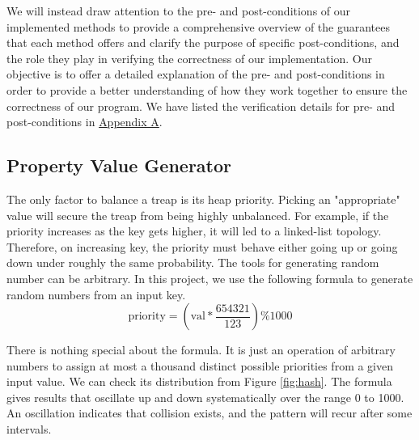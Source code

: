 We will instead draw attention to the pre- and post-conditions of our implemented methods to provide a comprehensive overview of the guarantees that each method offers and clarify the purpose of specific post-conditions, and the role they play in verifying the correctness of our implementation. Our objective is to offer a detailed explanation of the pre- and post-conditions in order to provide a better understanding of how they work together to ensure the correctness of our program. We have listed the verification details for pre- and post-conditions in \hyperref[sec:AppendixA]{Appendix A}.\\

\subsection{Property Value Generator}
The only factor to balance a treap is its heap priority. Picking an "appropriate" value will secure the treap from being highly unbalanced. For example, if the priority increases as the key gets higher, it will led to a linked-list topology. Therefore, on increasing key, the priority must behave either going up or going down under roughly the same probability. The tools for generating random number can be arbitrary. In this project, we use the following formula to generate random numbers from an input key.\\
\begin{equation}
    \text{priority} = (\text{val} * \frac{654321}{123}) \% 1000
\end{equation}

There is nothing special about the formula. It is just an operation of arbitrary numbers to assign at most a thousand distinct possible priorities from a given input value. We can check its distribution from Figure \ref*{fig:hash}. The formula gives results that oscillate up and down systematically over the range 0 to 1000. An oscillation indicates that collision exists, and the pattern will recur after some intervals.


